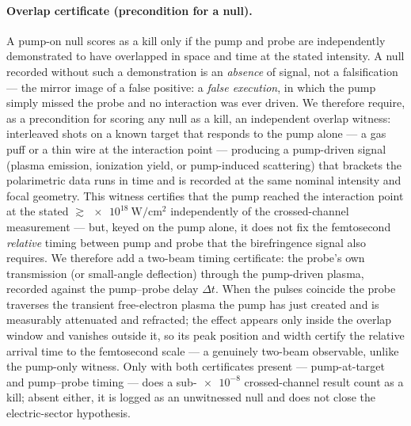 \documentclass[aps,prd,twocolumn,superscriptaddress,nofootinbib,longbibliography]{revtex4-2}
\begin{document}
\paragraph*{Overlap certificate (precondition for a null).}
A pump-on null scores as a kill only if the pump and probe are independently
demonstrated to have overlapped in space and time at the stated intensity. A null
recorded without such a demonstration is an \emph{absence} of signal, not a
falsification --- the mirror image of a false positive: a \emph{false execution},
in which the pump simply missed the probe and no interaction was ever driven. We
therefore require, as a precondition for scoring any null as a kill, an independent
overlap witness: interleaved shots on a known target that responds to the pump alone
--- a gas puff or a thin wire at the interaction point --- producing a pump-driven
signal (plasma emission, ionization yield, or pump-induced scattering) that brackets
the polarimetric data runs in time and is recorded at the same nominal intensity and
focal geometry. This witness certifies that the pump reached the interaction point at the
stated $\gtrsim\SI{e18}{\watt\per\centi\meter\squared}$ independently of the
crossed-channel measurement --- but, keyed on the pump alone, it does not fix the
femtosecond \emph{relative} timing between pump and probe that the birefringence
signal also requires. We therefore add a two-beam timing certificate: the probe's
own transmission (or small-angle deflection) through the pump-driven plasma,
recorded against the pump--probe delay $\Delta t$. When the pulses coincide the
probe traverses the transient free-electron plasma the pump has just created and
is measurably attenuated and refracted; the effect appears only inside the overlap
window and vanishes outside it, so its peak position and width certify the
relative arrival time to the femtosecond scale --- a genuinely two-beam observable,
unlike the pump-only witness. Only with both certificates present --- pump-at-target
and pump--probe timing --- does a sub-$\num{e-8}$ crossed-channel result count as a
kill; absent either, it is logged as an unwitnessed null and does not close the
electric-sector hypothesis.
\end{document}
